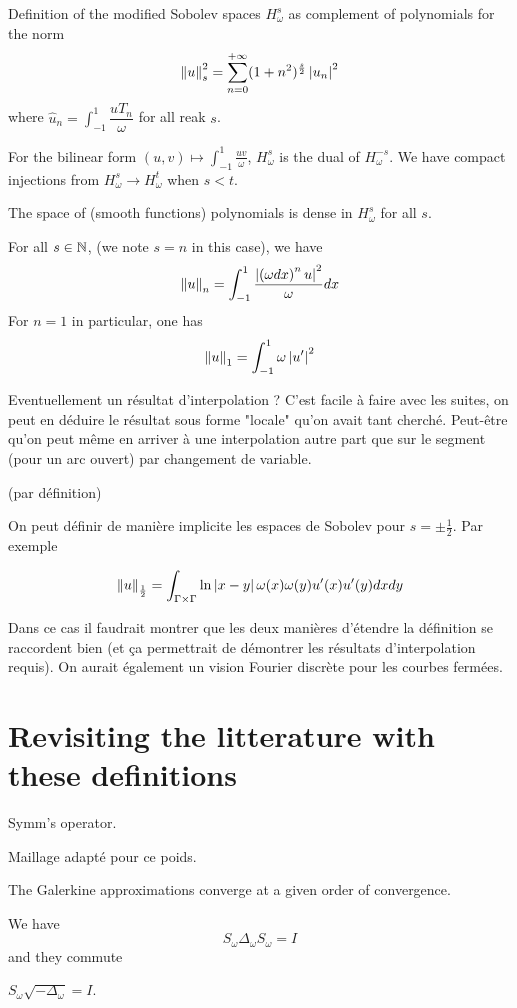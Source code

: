 \documentclass[]{article}
\begin{document}
\begin{Def}
	Definition of the modified Sobolev spaces $H^s_{\omega}$ as complement of polynomials for the norm 
	\[ \left\|u\right\|_s^2 = \sum_{n=0}^{+\infty} (1+n^2)^{\frac{s}{2}}\left\lvert {u}_n \right\rvert^2\]
	where $\hat{u}_n = \int_{-1}^1 \dfrac{uT_n}{\omega}$ for all reak $s$.  
\end{Def}
\begin{The}
	For the bilinear form $(u,v)\mapsto\int_{-1}^{1}\frac{uv}{\omega}$, $H^s_{\omega}$ is the dual of $H^{-s}_{\omega}$. We have compact injections from $H^s_{\omega} \to H^t_{\omega}$ when $s < t$. 
\end{The}
\begin{The}
	The space of (smooth functions) polynomials is dense in $H^s_\omega$ for all $s$. 
\end{The}
\begin{The}
	For all $s \in \mathbb{N}$, (we note $s=n$ in this case), we have 
	\[ \left\|u\right\|_n = \int_{-1}^{1} \dfrac{\left\lvert \left(\omega dx\right)^n u \right\rvert^2}{\omega}dx\] 
	For $n=1$ in particular, one has 
	\[ \left\|u\right\|_{1} = \int_{-1}^{1} \omega \left\lvert u' \right\rvert^2\]
\end{The}
\begin{The}
	Eventuellement un résultat d'interpolation ? C'est facile à faire avec les suites, on peut en déduire le résultat sous forme "locale" qu'on avait tant cherché. Peut-être qu'on peut même en arriver à une interpolation autre part que sur le segment (pour un arc ouvert) par changement de variable. 
\end{The}
(par définition)

\begin{The}
	On peut définir de manière implicite les espaces de Sobolev pour $s = \pm \frac{1}{2}$. Par exemple 
	
	\[\left\|u\right\|_{\frac{1}{2}} = \int_{\Gamma\times \Gamma} \ln\left\lvert x-y \right\rvert\omega(x)\omega(y) u'(x)u'(y)dxdy\]
\end{The}
Dans ce cas il faudrait montrer que les deux manières d'étendre la définition se raccordent bien (et ça permettrait de démontrer les résultats d'interpolation requis). On aurait également un vision Fourier discrète pour les courbes fermées. 


\section{Revisiting the litterature with these definitions}


Symm's operator. 
\begin{Def}
	Maillage adapté pour ce poids. 
\end{Def}
\begin{The}
	The Galerkine approximations converge at a given order of convergence. 
\end{The}
\begin{The}
	We have
	\[S_{\omega}\Delta_\omega S_\omega = I\]
	and they commute
\end{The}
\begin{The}
	$S_\omega\sqrt{-\Delta_\omega} = I$. 
\end{The}
\end{document}
